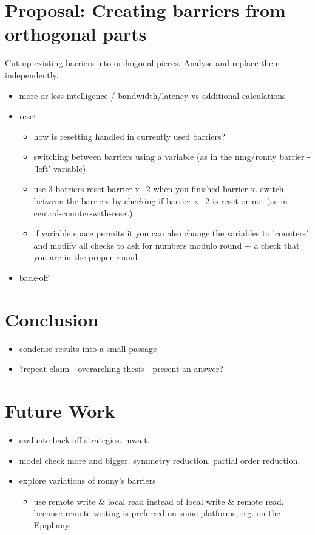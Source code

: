 \documentclass[a4paper, 10pt]{article}
\begin{document}
\section{Proposal: Creating barriers from orthogonal parts}
Cut up existing barriers into orthogonal pieces. Analyse and replace them independently.
\begin{itemize}
	\item more or less intelligence / bandwidth/latency vs additional calculations
	\item 
		reset

		\begin{itemize}
			\item how is resetting handled in currently used barriers?
			\item switching between barriers using a variable (as in the nmg/ronny barrier - 'left' variable)
			\item use 3 barriers reset barrier x+2 when you finished barrier x. switch between the barriers by checking if barrier x+2 is reset or not (as in central-counter-with-reset)
			\item if variable space permits it you can also change the variables to 'counters' and modify all checks to ask for numbers modulo round + a check that you are in the proper round
		\end{itemize}

	\item back-off
\end{itemize}

\section{Conclusion}
\begin{itemize}
	\item condense results into a small passage
	\item ?repeat claim - overarching thesis - present an answer?
\end{itemize}

\section{Future Work}
\begin{itemize}
	\item evaluate back-off strategies. mwait.
	\item model check more and bigger. symmetry reduction. partial order reduction.
	\item explore variations of ronny's barriers
		\begin{itemize}
			\item use remote write \& local read instead of local write \& remote read, because remote writing is preferred on some platforms, e.g. on the Epiphany\cite{epiphany}.
		\end{itemize}
\end{itemize}
\end{document}
